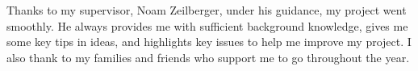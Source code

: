 
\setlength\parindent{0pt} 
\setlength\parskip{\medskipamount}

%

Thanks to my supervisor, Noam Zeilberger, under his guidance, my project went smoothly. He always provides me with sufficient background knowledge, gives me some key tips in ideas, and highlights key issues to help me improve my project. I also thank to my families and friends who support me to go throughout the year.
  